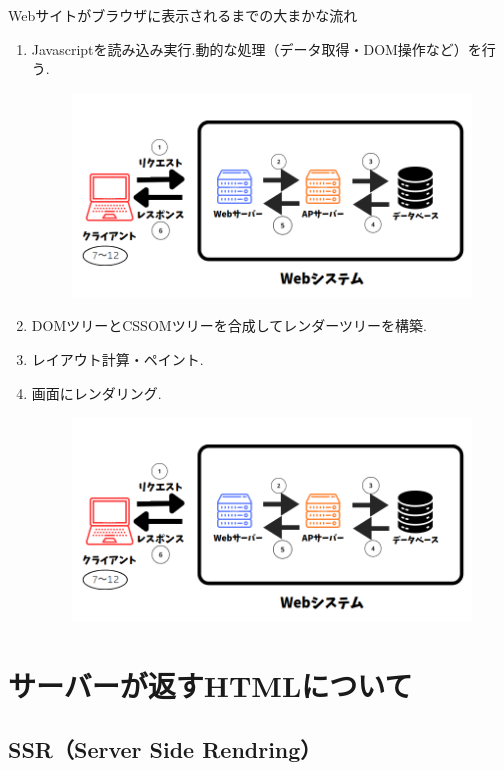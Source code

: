 \documentclass[aspectratio=169]{beamer}
\begin{document}
\begin{frame}[allowframebreaks]{Webサイトがブラウザに表示されるまでの大まかな流れ}
\begin{enumerate}
        \item Javascriptを読み込み実行.動的な処理（データ取得・DOM操作など）を行う.
        \begin{figure}
            \includegraphics[scale=0.20]{webfloat.png}
        \end{figure}
        \item DOMツリーとCSSOMツリーを合成してレンダーツリーを構築.
        \item レイアウト計算・ペイント.
        \item 画面にレンダリング.
        \begin{figure}
            \includegraphics[scale=0.20]{webfloat.png}
        \end{figure}
    \end{enumerate}
    
\end{frame}
\section{サーバーが返すHTMLについて}
\subsection{SSR（Server Side Rendring）}
\end{document}

